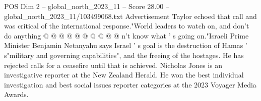 \begin{textsample}{POS Dim 2 – global\_north\_2023\_11 – Score 28.00 – global\_north\_2023\_11/103499068.txt}
Advertisement Taylor echoed that call and was critical of the international response."World leaders to watch on, and don't do anything @ @ @ @ @ @ @ @ @ @ n't know what ' s going on."Israeli Prime Minister Benjamin Netanyahu says Israel ' s goal is the destruction of Hamas ' s"military and governing capabilities", and the freeing of the hostages.
He has rejected calls for a ceasefire until that is achieved.
Nicholas Jones is an investigative reporter at the New Zealand Herald.
He won the best individual investigation and best social issues reporter categories at the 2023 Voyager Media Awards.

\end{textsample}
